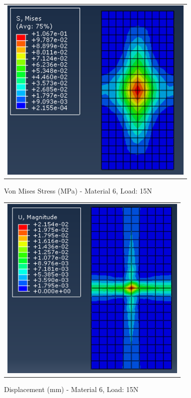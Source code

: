 \documentclass[a4paper,12pt]{article}
\numberwithin{equation}{section}
\numberwithin{figure}{section}
\begin{document}
\begin{figure}[H]
  \centering
  \begin{tabular}{@{}c@{}}
    \includegraphics[width=0.7\linewidth,height=255pt]{Results/Point Loading/M6_VMS_L3_new.png} \\
  \end{tabular}
  \caption{Von Mises Stress (MPa) - Material 6, Load: 15N}
\end{figure}

\begin{figure}[H]
  \centering
  \begin{tabular}{@{}c@{}}
    \includegraphics[width=0.7\linewidth,height=255pt]{Results/Point Loading/M6_DIS_L3_new.png} \\
  \end{tabular}
  \caption{Displacement (mm) - Material 6, Load: 15N}
\end{figure}
\end{document}
